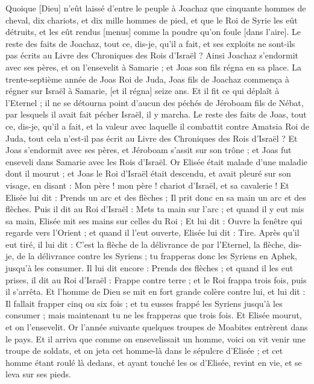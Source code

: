 \begin{multicols}{2}
Quoique [Dieu] n'eût laissé d'entre le peuple à Joachaz que cinquante hommes de cheval, dix chariots, et dix mille hommes de pied, et que le Roi de Syrie les eût détruits, et les eût rendus [menus] comme la poudre qu'on foule [dans l'aire].
Le reste des faits de Joachaz, tout ce, dis-je, qu'il a fait, et ses exploits ne sont-ils pas écrits au Livre des Chroniques des Rois d'Israël ?
Ainsi Joachaz s'endormit avec ses pères, et on l'ensevelit à Samarie ; et Joas son fils régna en sa place.
La trente-septième année de Joas Roi de Juda, Joas fils de Joachaz commença à régner sur Israël à Samarie, [et il régna] seize ans.
Et il fit ce qui déplaît à l'Eternel ; il ne se détourna point d'aucun des péchés de Jéroboam fils de Nébat, par lesquels il avait fait pécher Israël, il y marcha.
Le reste des faits de Joas, tout ce, dis-je, qu'il a fait, et la valeur avec laquelle il combattit contre Amatsia Roi de Juda, tout cela n'est-il pas écrit au Livre des Chroniques des Rois d'Israël ?
Et Joas s'endormit avec ses pères, et Jéroboam s'assit sur son trône ; et Joas fut enseveli dans Samarie avec les Rois d'Israël.
Or Elisée était malade d'une maladie dont il mourut ; et Joas le Roi d'Israël était descendu, et avait pleuré sur son visage, en disant : Mon père ! mon père ! chariot d'Israël, et sa cavalerie !
Et Elisée lui dit : Prends un arc et des flèches ; Il prit donc en sa main un arc et des flèches.
Puis il dit au Roi d'Israël : Mets ta main sur l'arc ; et quand il y eut mis sa main, Elisée mit ses mains sur celles du Roi ;
Et lui dit : Ouvre la fenêtre qui regarde vers l'Orient ; et quand il l'eut ouverte, Elisée lui dit : Tire. Après qu'il eut tiré, il lui dit : C'est la flèche de la délivrance de par l'Eternel, la flèche, dis-je, de la délivrance contre les Syriens ; tu frapperas donc les Syriens en Aphek, jusqu'à les consumer.
Il lui dit encore : Prends des flèches ; et quand il les eut prises, il dit au Roi d'Israël : Frappe contre terre ; et le Roi frappa trois fois, puis il s'arrêta.
Et l'homme de Dieu se mit en fort grande colère contre lui, et lui dit : Il fallait frapper cinq ou six fois ; et tu eusses frappé les Syriens jusqu'à les consumer ; mais maintenant tu ne les frapperas que trois fois.
Et Elisée mourut, et on l'ensevelit. Or l'année suivante quelques troupes de Moabites entrèrent dans le pays.
Et il arriva que comme on ensevelissait un homme, voici on vit venir une troupe de soldats, et on jeta cet homme-là dans le sépulcre d'Elisée ; et cet homme étant roulé là dedans, et ayant touché les os d'Elisée, revint en vie, et se leva sur ses pieds.

\end{multicols}
